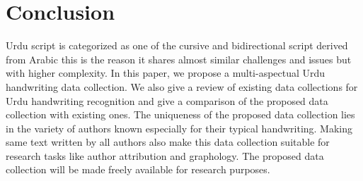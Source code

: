 \section{Conclusion} \label{Con}
Urdu script is categorized as one of the cursive and bidirectional script derived from Arabic this is the reason it shares almost similar challenges and issues but with higher complexity. In this paper, we propose a multi-aspectual Urdu handwriting data collection. We also give a review of existing data collections for Urdu handwriting recognition and give a comparison of the proposed data collection with existing ones. The uniqueness of the proposed data collection lies in the variety of authors known especially for their typical handwriting. Making same text written by all authors also make this data collection suitable for research tasks like author attribution and graphology. The proposed data collection will be made freely available for research purposes.  


